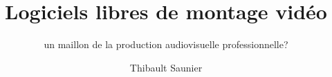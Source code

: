 \documentclass[a4paper,12pt]{book}
\begin{document}
\title{Logiciels libres de montage vidéo}
\subtitle{un maillon de la production audiovisuelle professionnelle?}
\author{Thibault Saunier}
\withdate
\subject{Les logiciels de montage vidéos libre en milieu professionnel}
\maketitle





\dominitoc
\setcounter{secnumdepth}{3}
\setcounter{minitocdepth}{3}
\setcounter{tocdepth}{1}
\tableofcontents{}

\thispagestyle{empty}






\newpage
\pagestyle{empty}
\setcounter{tocdepth}{3}



\newpage
\printindex
\listoffigures

\newpage
\printglossary

\newpage



\end{document}
